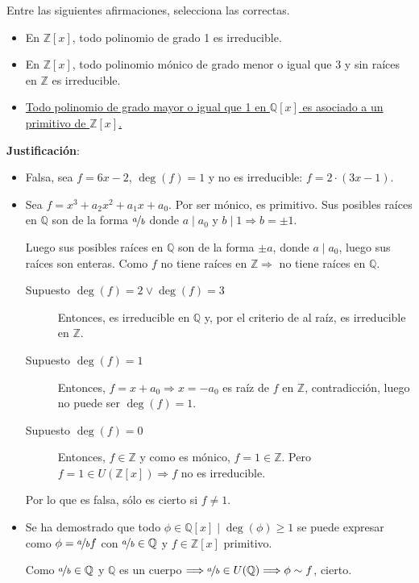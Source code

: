 \begin{ejercicio}
    Entre las siguientes afirmaciones, selecciona las correctas.
    \begin{itemize}
        \item En $\mathbb{Z}[x]$, todo polinomio de grado 1 es irreducible.
        \item En $\mathbb{Z}[x]$, todo polinomio mónico de grado menor o igual que 3 y sin raíces en $\mathbb{Z}$ es irreducible.
    \item \underline{Todo polinomio de grado mayor o igual que 1 en $\mathbb{Q}[x]$ es asociado a un}\newline
        \underline{primitivo de $\mathbb{Z}[x]$.}
    \end{itemize}

    \noindent
    \textbf{Justificación}:
    \begin{itemize}
        \item Falsa, sea $f=6x-2$, $\deg(f)=1$ y no es irreducible: $f=2\cdot (3x-1)$.
        \item Sea $f = x^3 + a_2 x^2 + a_1x + a_0$. Por ser mónico, es primitivo. Sus posibles raíces en $\mathbb{Q}$ son de la forma $\nicefrac{a}{b}$ donde $a\mid a_0$ y $b\mid 1 \Longrightarrow b = \pm 1$. 

            Luego sus posibles raíces en $\mathbb{Q}$ son de la forma $\pm a$, donde $a\mid a_0$, luego sus raíces son enteras. Como $f$ no tiene raíces en $\mathbb{Z} \Longrightarrow $ no tiene raíces en $\mathbb{Q}$.

            \begin{description}
                \item [Supuesto $\deg(f)=2 \lor \deg(f)=3$] Entonces, es irreducible en $\mathbb{Q}$ y, por el criterio de al raíz, es irreducible en $\mathbb{Z}$.
                \item [Supuesto $\deg(f)=1$] Entonces, $f=x+a_0 \Longrightarrow x=-a_0$ es raíz de $f$ en $\mathbb{Z}$, contradicción, luego no puede ser $\deg(f)=1$.
                \item [Supuesto $\deg(f)=0$] Entonces, $f\in \mathbb{Z}$ y como es mónico, $f=1\in \mathbb{Z}$. Pero $f=1\in U(\mathbb{Z}[x]) \Longrightarrow f$ no es irreducible.
            \end{description}
            Por lo que es falsa, sólo es cierto si $f\neq 1$.
            
        \item Se ha demostrado que todo $\phi \in \mathbb{Q}[x] \mid \deg(\phi)\geq1$  se puede expresar como $\phi = \nicefrac{a}{b}f$ con $\nicefrac{a}{b}\in \mathbb{Q}$ y $f\in \mathbb{Z}[x]$ primitivo.

            Como $\nicefrac{a}{b}\in \mathbb{Q}$ y $\mathbb{Q}$ es un cuerpo $\Longrightarrow \nicefrac{a}{b}\in U(\mathbb{Q})\Longrightarrow \phi \sim f$, cierto.
    \end{itemize}
\end{ejercicio}

